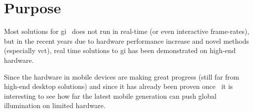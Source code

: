




\section{Purpose}




Most solutions for \gls{gi}~\cite{sotagi} does not run in real-time (or even interactive frame-rates), but in the recent years due to hardware performance increase and novel methods (especially \gls{vct}), real time solutions to \gls{gi} has been demonstrated on high-end hardware. 

Since the hardware in mobile devices are making great progress (still far from high-end desktop solutions) and since it has already been proven once~\cite{gimobile} it is interesting to see how far the latest mobile generation can push global illumination on limited hardware.

